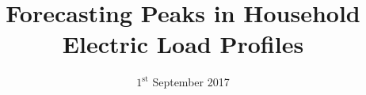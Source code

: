 \documentclass[a4paper, 11.99pt,oneside]{Thesis}  %
\begin{document}
\frontmatter      %

\title{Forecasting Peaks in Household Electric Load Profiles}
\addresses  {\groupname\\\deptname\\\univname}  %
\date{$1^{\text{st}}$ September 2017}
\subject{}
\keywords{}

\maketitle


\fancyhead{}  %
\rhead{\thepage}  %
\lhead{}  %

\pagestyle{fancy}  %
\end{document}
